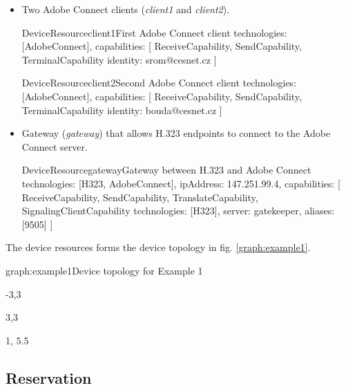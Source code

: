 \begin{itemize}
\item Two Adobe Connect clients (\emph{client1} and \emph{client2}).

\begin{EntityExample}{DeviceResource}{client1}{First Adobe Connect client}
technologies: [AdobeConnect], 
capabilities: [
  ReceiveCapability, SendCapability,
  TerminalCapability {identity: srom@cesnet.cz}
]
\end{EntityExample}

\begin{EntityExample}{DeviceResource}{client2}{Second Adobe Connect client}
technologies: [AdobeConnect], 
capabilities: [
  ReceiveCapability, SendCapability,
  TerminalCapability {identity: bouda@cesnet.cz}
]
\end{EntityExample}

\item Gateway (\emph{gateway}) that allows H.323 endpoints to connect to
  the Adobe Connect server.
    
\begin{EntityExample}{DeviceResource}{gateway}{Gateway between H.323 and Adobe Connect}
technologies: [H323, AdobeConnect], 
ipAddress: 147.251.99.4,
capabilities: [
  ReceiveCapability, SendCapability,
  TranslateCapability,
  SignalingClientCapability {technologies: [H323], server: gatekeeper, 
     aliases: [9505]}
]
\end{EntityExample}

\end{itemize}

The device resources forms the device topology in fig. \ref{graph:example1}. 

\begin{Graph}{graph:example1}{Device topology for Example 1}  
  \begin{SubGraph}{-3,3}{}
  \end{SubGraph}
  
  \begin{SubGraph}{3,3}{}
  \end{SubGraph}
  
  
  \begin{GraphLegend}{1, 5.5}
  \end{GraphLegend}
\end{Graph}

\subsection{Reservation}

 \\
 \\
